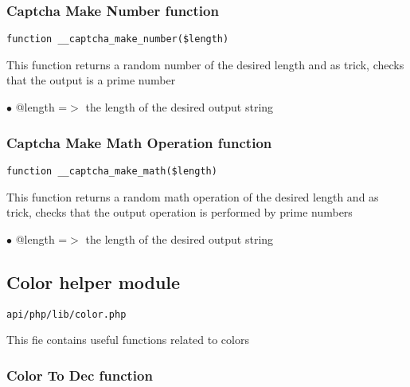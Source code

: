 \documentclass[a4paper]{article}
\begin{document}
\hypertarget{toc394}{}
\subsubsection{Captcha Make Number function}

\begin{lstlisting}
function __captcha_make_number($length)
\end{lstlisting}

This function returns a random number of the desired length and as trick,
checks that the output is a prime number

\begin{compactitem}
\item[\color{myblue}$\bullet$] @length =$>$ the length of the desired output string
\end{compactitem}

\hypertarget{toc395}{}
\subsubsection{Captcha Make Math Operation function}

\begin{lstlisting}
function __captcha_make_math($length)
\end{lstlisting}

This function returns a random math operation of the desired length and
as trick, checks that the output operation is performed by prime numbers

\begin{compactitem}
\item[\color{myblue}$\bullet$] @length =$>$ the length of the desired output string
\end{compactitem}

\hypertarget{toc396}{}
\subsection{Color helper module}

\begin{lstlisting}
api/php/lib/color.php
\end{lstlisting}

This fie contains useful functions related to colors

\hypertarget{toc397}{}
\subsubsection{Color To Dec function}
\end{document}
